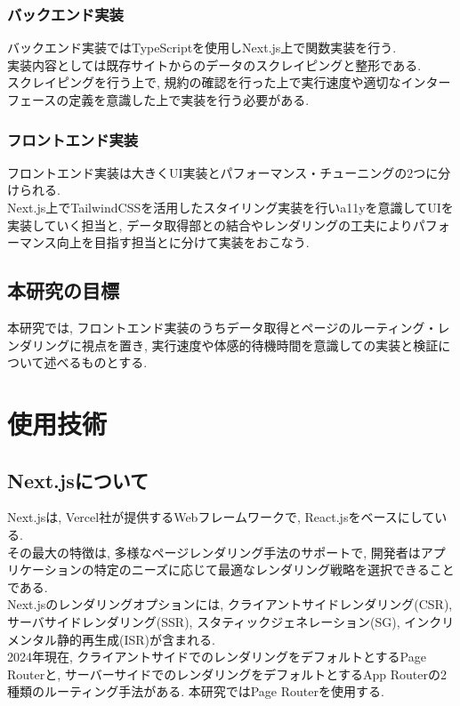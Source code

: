 \subsubsection{バックエンド実装}
バックエンド実装ではTypeScriptを使用しNext.js上で関数実装を行う. \\
実装内容としては既存サイトからのデータのスクレイピングと整形である. \\
スクレイピングを行う上で, 規約の確認を行った上で実行速度や適切なインターフェースの定義を意識した上で実装を行う必要がある.

\subsubsection{フロントエンド実装}
フロントエンド実装は大きくUI実装とパフォーマンス・チューニングの2つに分けられる.\\
Next.js上でTailwindCSSを活用したスタイリング実装を行いa11yを意識してUIを実装していく担当と, データ取得部との結合やレンダリングの工夫によりパフォーマンス向上を目指す担当とに分けて実装をおこなう.

\subsection{本研究の目標}
本研究では, フロントエンド実装のうちデータ取得とページのルーティング・レンダリングに視点を置き, 実行速度や体感的待機時間を意識しての実装と検証について述べるものとする. 

\section{使用技術}
\subsection{Next.jsについて}
Next.jsは, Vercel社が提供するWebフレームワークで, React.jsをベースにしている. \\
その最大の特徴は, 多様なページレンダリング手法のサポートで, 開発者はアプリケーションの特定のニーズに応じて最適なレンダリング戦略を選択できることである.\cite{no5} \\
Next.jsのレンダリングオプションには, クライアントサイドレンダリング(CSR), サーバサイドレンダリング(SSR), スタティックジェネレーション(SG), インクリメンタル静的再生成(ISR)が含まれる. \\
2024年現在, クライアントサイドでのレンダリングをデフォルトとするPage Routerと, サーバーサイドでのレンダリングをデフォルトとするApp Routerの2種類のルーティング手法がある. 本研究ではPage Routerを使用する. 


